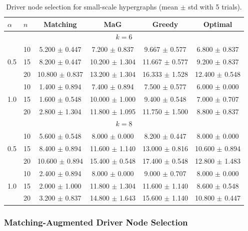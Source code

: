 \documentclass[journal,twoside,web]{ieeecolor}
\begin{document}
\begin{table}
\caption{Driver node selection for small-scale hypergraphs (mean $\pm$ std with 5 trials).}
\label{tab: exp 1}
\small
\centering
\setlength{\tabcolsep}{15pt}
\renewcommand{\arraystretch}{1.2}
\begin{tabular}{ll|ccc|c}
\toprule
$\alpha$ & $n$ & Matching & MaG & Greedy & Optimal \\
\midrule
\multicolumn{6}{c}{$k=6$}\\
\midrule
\multirow[c]{3}{*}{0.5} & 10 & 5.200 $\pm$ 0.447 & 7.200 $\pm$ 0.837 & 9.667 $\pm$ 0.577 & 6.800 $\pm$ 0.837 \\
 & 15 & 8.200 $\pm$ 0.447 & 10.200 $\pm$ 1.304 & 11.667 $\pm$ 0.577 & 9.200 $\pm$ 0.837 \\
 & 20 & 10.800 $\pm$ 0.837 & 13.200 $\pm$ 1.304 & 16.333 $\pm$ 1.528 & 12.400 $\pm$ 0.548 \\
\midrule
\multirow[c]{3}{*}{1.0} & 10 & 1.400 $\pm$ 0.894 & 7.400 $\pm$ 0.894 & 7.500 $\pm$ 0.577 & 6.000 $\pm$ 0.000 \\
 & 15 & 1.600 $\pm$ 0.548 & 10.000 $\pm$ 1.000 & 9.400 $\pm$ 0.548 & 7.000 $\pm$ 0.707 \\
 & 20 & 2.800 $\pm$ 1.304 & 11.800 $\pm$ 1.095 & 11.750 $\pm$ 1.500 & 8.800 $\pm$ 0.837 \\
\midrule
\multicolumn{6}{c}{$k=8$}\\
\midrule
\multirow[c]{3}{*}{0.5} & 10 & 5.600 $\pm$ 0.548 & 8.000 $\pm$ 0.000 & 8.200 $\pm$ 0.447 & 8.000 $\pm$ 0.000 \\
 & 15 & 8.400 $\pm$ 0.894 & 11.600 $\pm$ 1.140 & 13.000 $\pm$ 0.816 & 10.600 $\pm$ 0.894 \\
 & 20 & 10.600 $\pm$ 0.894 & 15.400 $\pm$ 0.548 & 17.400 $\pm$ 0.548 & 12.800 $\pm$ 1.483 \\
\midrule
\multirow[c]{3}{*}{1.0} & 10 & 2.400 $\pm$ 0.894 & 8.000 $\pm$ 0.000 & 9.000 $\pm$ 0.707 & 8.000 $\pm$ 0.000 \\
 & 15 & 2.000 $\pm$ 1.000 & 11.800 $\pm$ 1.304 & 11.600 $\pm$ 1.140 & 8.600 $\pm$ 0.548 \\
 & 20 & 3.200 $\pm$ 0.837 & 14.800 $\pm$ 1.643 & 15.600 $\pm$ 1.140 & 10.800 $\pm$ 0.447 \\
\bottomrule
\end{tabular}
\end{table}



\subsubsection{Matching-Augmented Driver Node Selection}
\end{document}
